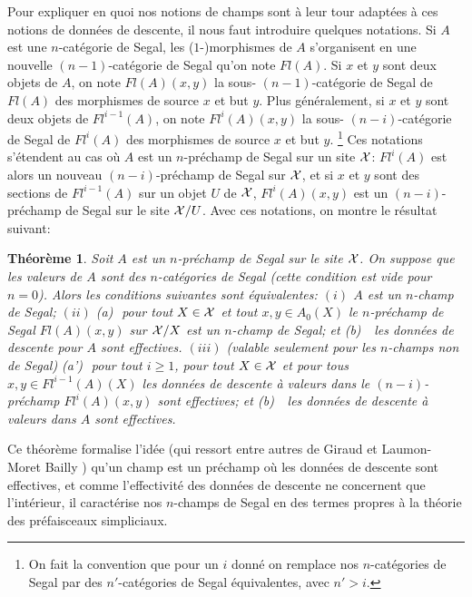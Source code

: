 \documentclass[12pt]{article}
\newtheorem{theoreme}[lemma]{Th\'eor\`eme}
\newcommand{\Xx}{{\cal X}}
\begin{document}
Pour expliquer en quoi
nos notions de champs sont \`a leur tour adapt\'ees \`a
ces notions de donn\'ees de descente, il nous faut introduire
quelques notations.
Si $A$ est une $n$-cat\'egorie de Segal, les ($1$-)morphismes de $A$
s'organisent en une nouvelle $(n-1)$-cat\'egorie de Segal qu'on note $Fl(A)$.
Si $x$ et $y$ sont deux objets de $A$, on note $Fl(A)(x,y)$ la sous-
$(n-1)$-cat\'egorie de Segal de $Fl(A)$ des morphismes de source $x$ et but
$y$. Plus g\'en\'eralement, si $x$ et $y$ sont deux objets de $Fl^{i-1}(A)$,
on note $Fl^{i}(A)(x,y)$ la sous-
$(n-i)$-cat\'egorie de Segal de $Fl^i(A)$ des morphismes de source $x$ et
but $y$.
\footnote{
On fait la convention que pour un $i$ donn\'e on remplace nos
$n$-cat\'egories de Segal par des $n'$-cat\'egories de Segal \'equivalentes,
avec $n'>i$.}
Ces notations s'\'etendent au cas o\`u $A$ est un $n$-pr\'echamp de
Segal sur un site $\Xx$: $Fl^i(A)$ est alors un nouveau $(n-i)$-pr\'echamp de
Segal  sur $\Xx$, et si $x$ et $y$ sont des sections de $Fl^{i-1}(A)$ sur un
objet $U$ de $\Xx$, $Fl^{i}(A)(x,y)$ est un $(n-i)$-pr\'echamp de Segal sur le
site $\Xx/U$.
Avec ces notations,
on montre le r\'esultat suivant:
\begin{theoreme}
Soit $A$ est un $n$-pr\'echamp de Segal sur le site $\Xx$.
On suppose que les valeurs de $A$ sont
des $n$-cat\'egories de Segal (cette condition est vide pour $n=0$).
Alors les conditions suivantes
sont \'equivalentes:
\newline
$(i)$ $A$ est un $n$-champ de Segal;
\newline
$(ii)$
(a)\,\, pour tout $X\in \Xx$ et tout $x,y\in A_0(X)$ le $n$-pr\'echamp
de Segal $Fl(A)(x,y)$ sur $\Xx /X$ est un $n$-champ de Segal; et
\newline
(b) \,\, les donn\'ees de descente pour $A$
sont effectives.
\newline
$(iii)$ (valable seulement pour les $n$-champs non de Segal)\newline
(a')\,\, pour tout $i \ge 1$, pour tout
$X\in \Xx$ et pour tous $x,y\in Fl^{i-1}(A)(X)$ les donn\'ees de descente
\`a valeurs dans le $(n-i)$-pr\'echamp $Fl^{i}(A)(x,y)$ sont effectives; et
\newline
(b) \,\, les donn\'ees de descente \`a valeurs dans $A$
sont effectives.
\end {theoreme}

Ce th\'eor\`eme formalise l'id\'ee (qui ressort entre autres de Giraud
\cite{GiraudThese} et Laumon-Moret Bailly \cite{LaumonMB}) qu'un champ est un
pr\'echamp o\`u les donn\'ees de descente sont effectives, et comme
l'effectivit\'e des donn\'ees de descente ne concernent que l'int\'erieur,
il caract\'erise nos
$n$-champs de Segal en des termes propres \`a la th\'eorie des
pr\'efaisceaux simpliciaux.
\end{document}
